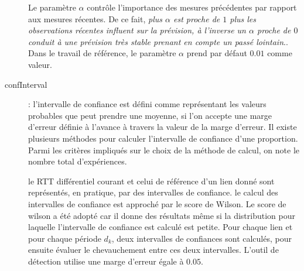 \begin{description}
Le paramètre $\alpha$  contrôle l'importance  des mesures précédentes par rapport aux mesures récentes. De ce fait, \guillemotleft \textit{plus $\alpha$ est proche de $ 1 $ plus les observations récentes influent sur la prévision, à l'inverse un $\alpha$ proche de $0$ conduit à une prévision très stable prenant en compte un passé lointain}.\guillemotright\cite{Lissages-Exponentiels}.  Dans le travail de référence, le paramètre $\alpha$  prend par défaut $0.01$ comme valeur.


\item[confInterval] : l'intervalle de confiance  est défini comme représentant les valeurs probables que peut prendre une moyenne, si l'on accepte une marge d'erreur définie à l'avance à travers la valeur de la marge d'erreur. Il existe plusieurs méthodes pour calculer l'intervalle de confiance d'une proportion. Parmi les critères impliqués sur le choix de la méthode de calcul, on note le nombre total d'expériences.

le RTT différentiel courant et  celui de référence d'un lien donné sont représentés, en pratique, par des intervalles de confiance.  le calcul des intervalles de confiance  est approché par le score de Wilson. Le score de wilson a été adopté car il donne des résultats même si la distribution pour laquelle l'intervalle de confiance est calculé est petite. Pour chaque lien et pour chaque période $d_k$,  deux intervalles de confiances sont calculés, pour ensuite évaluer le chevauchement entre ces deux intervalles. L'outil de détection utilise une marge d'erreur égale à  $ 0.05 $.





\end{description}
